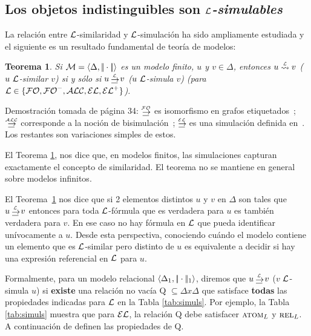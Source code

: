 \subsection{Los objetos indistinguibles son \emph{$\mathcal{L}$-simulables}}

La relaci\'on entre $\mathcal{L}$-similaridad y $\mathcal{L}$-simulaci\'on ha sido ampliamente estudiada y el siguiente es un resultado fundamental de teor\'ia de modelos:


\newtheorem{teorema}{Teorema}
\begin{teorema} \label{thm:simulation}
Si  $\mathcal{M} = \langle \Delta, |\!|\cdot|\!| \rangle$ es un modelo finito, $u$ y $v \in \Delta$, entonces $u \simil{\+L} v$ ($u~\mathcal{L}$-similar $v$) si y s\'olo si 
$u \simul{\+L} v$ ($u~\mathcal{L}$-simula $v$) (para $\mathcal{L} \in \{\mathcal{FO},{\mathcal{FO}^-},\mathcal{ALC},\mathcal{EL},{\mathcal{EL}^+}\}$).
\end{teorema}

Demostraci\'on tomada de \cite{arec:usin11} p\'agina 34: $\simul{\FOL}$ es isomorfismo en
grafos etiquetados~\cite{ebbi:math96}; $\simul{\ALC}$ corresponde a la
noci\'on de bisimulaci\'on~\cite[Def.~2.16]{BRV01}; $\simul{\EL}$ es una
simulaci\'on definida en~\cite[Def.~2.77]{BRV01}. Los restantes son variaciones simples de estos.

El Teorema \ref{thm:simulation}, nos dice que, en modelos finitos, las simulaciones capturan exactamente el concepto de similaridad. El teorema no se mantiene en general sobre modelos infinitos.

El Teorema~\ref{thm:simulation} nos dice que si 2 elementos distintos $u$ y $v$ en $\Delta$ son tales que $u
\simul{\+L} v$ entonces para toda $\mathcal{L}$-f\'ormula que es verdadera para $u$ es tambi\'en verdadera para $v$. En ese caso no hay f\'ormula en $\mathcal{L}$ que pueda identificar un\'ivocamente a $u$. Desde esta perspectiva, conociendo cu\'ando el modelo contiene un elemento que es $\mathcal{L}$-similar pero distinto de $u$ es
equivalente a decidir si hay una expresi\'on referencial en $\mathcal{L}$ para $u$.

Formalmente, para un modelo relacional $\langle \Delta_1, |\!|\cdot|\!|_1 \rangle$, diremos que $u \simul{\+L} v$ ($v$ $\mathcal{L}$-simula $u$) si \textbf{existe} una relaci\'on no vac\'ia Q $\subseteq \Delta x \Delta$ que satisface \textbf{todas} las propiedades indicadas para $\mathcal{L}$ en la Tabla \ref{tab:simuls}. Por ejemplo, la Tabla \ref{tab:simuls} muestra que para $\mathcal{EL}$, la relaci\'on Q debe satisfacer $\textsc{atom}_L$ y $\textsc{rel}_L$. A continuaci\'on de definen las propiedades de Q.
\smallskip 

